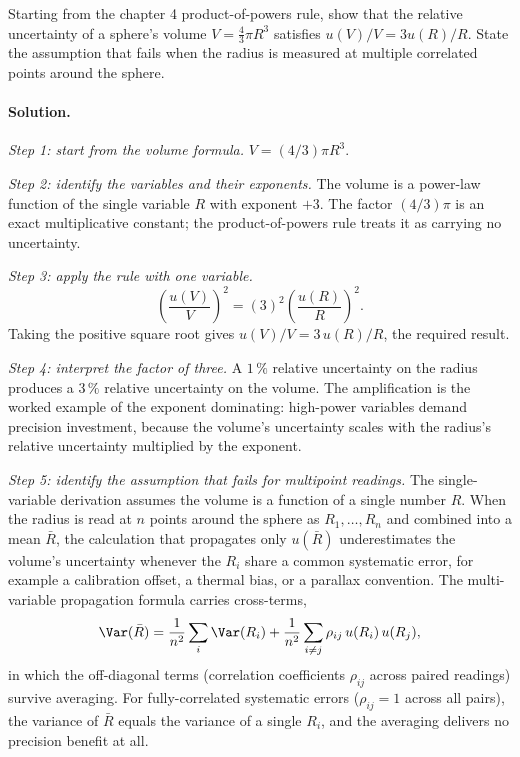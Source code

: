 \begin{exercise}
Starting from the chapter 4 product-of-powers rule, show that the
relative uncertainty of a sphere's volume $V = \tfrac{4}{3}\pi R^{3}$
satisfies $u(V)/V = 3 u(R)/R$. State the assumption that fails when
the radius is measured at multiple correlated points around the
sphere.
\end{exercise}

\paragraph{Solution.}

\emph{Step 1: start from the volume formula.}
$V = (4/3)\pi R^{3}$.

\emph{Step 2: identify the variables and their exponents.}
The volume is a power-law function of the single variable $R$ with
exponent $+3$. The factor $(4/3)\pi$ is an exact multiplicative
constant; the product-of-powers rule treats it as carrying no
uncertainty.

\emph{Step 3: apply the rule with one variable.}
\[
\left(\frac{u(V)}{V}\right)^{2} = (3)^{2} \left(\frac{u(R)}{R}
\right)^{2}.
\]
Taking the positive square root gives $u(V)/V = 3 \, u(R)/R$, the
required result.

\emph{Step 4: interpret the factor of three.}
A $1\,\%$ relative uncertainty on the radius produces a $3\,\%$
relative uncertainty on the volume. The amplification is the
worked example of the exponent dominating: high-power variables
demand precision investment, because the volume's uncertainty
scales with the radius's relative uncertainty multiplied by the
exponent.

\emph{Step 5: identify the assumption that fails for multipoint
readings.}
The single-variable derivation assumes the volume is a function of
a single number $R$. When the radius is read at $n$ points around
the sphere as $R_{1}, \ldots, R_{n}$ and combined into a mean
$\bar R$, the calculation that propagates only $u(\bar R)$
underestimates the volume's uncertainty whenever the $R_{i}$
share a common systematic error, for example a calibration
offset, a thermal bias, or a parallax convention. The
multi-variable propagation formula carries cross-terms,
\[
\Var(\bar R) = \frac{1}{n^{2}} \sum_{i} \Var(R_{i}) +
\frac{1}{n^{2}} \sum_{i \ne j} \rho_{ij} \, u(R_{i}) \, u(R_{j}),
\]
in which the off-diagonal terms (correlation coefficients
$\rho_{ij}$ across paired readings) survive averaging. For
fully-correlated systematic errors ($\rho_{ij} = 1$ across all
pairs), the variance of $\bar R$ equals the variance of a single
$R_{i}$, and the averaging delivers no precision benefit at all.


